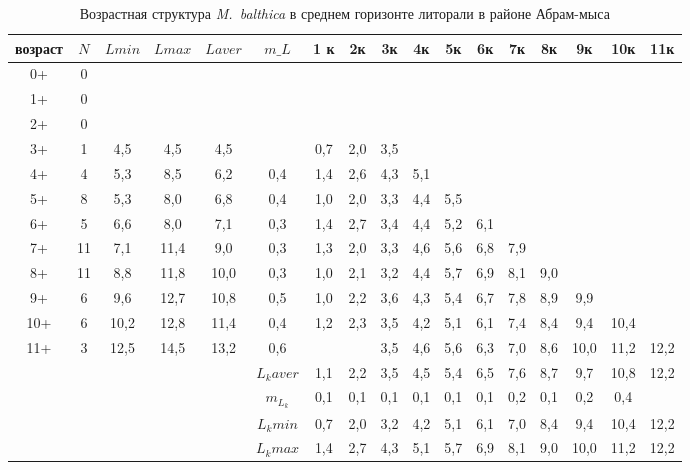 \begin{landscape}

\begin{table}[h]
\caption{Возрастная структура {\it M.~balthica} в среднем горизонте литорали в районе Абрам-мыса }
\label{tab:Abram_sgl_growth_matrix}
\begin{tabular}{|c|c|cc|cc|ccccccccccc|}
\hline
возраст & $N$  & $L min$ & $L max$ & $L aver$ & $m\_L$    & 1 к & 2к  & 3к  & 4к  & 5к  & 6к  & 7к  & 8к  & 9к   & 10к  & 11к  \\ \hline
0+      & 0  &       &       &         &         &     &     &     &     &     &     &     &     &      &      &      \\
1+      & 0  &       &       &         &         &     &     &     &     &     &     &     &     &      &      &      \\
2+      & 0  &       &       &         &         &     &     &     &     &     &     &     &     &      &      &      \\
3+      & 1  & 4,5   & 4,5   & 4,5     &         & 0,7 & 2,0 & 3,5 &     &     &     &     &     &      &      &      \\
4+      & 4  & 5,3   & 8,5   & 6,2     & 0,4     & 1,4 & 2,6 & 4,3 & 5,1 &     &     &     &     &      &      &      \\
5+      & 8  & 5,3   & 8,0   & 6,8     & 0,4     & 1,0 & 2,0 & 3,3 & 4,4 & 5,5 &     &     &     &      &      &      \\
6+      & 5  & 6,6   & 8,0   & 7,1     & 0,3     & 1,4 & 2,7 & 3,4 & 4,4 & 5,2 & 6,1 &     &     &      &      &      \\
7+      & 11 & 7,1   & 11,4  & 9,0     & 0,3     & 1,3 & 2,0 & 3,3 & 4,6 & 5,6 & 6,8 & 7,9 &     &      &      &      \\
8+      & 11 & 8,8   & 11,8  & 10,0    & 0,3     & 1,0 & 2,1 & 3,2 & 4,4 & 5,7 & 6,9 & 8,1 & 9,0 &      &      &      \\
9+      & 6  & 9,6   & 12,7  & 10,8    & 0,5     & 1,0 & 2,2 & 3,6 & 4,3 & 5,4 & 6,7 & 7,8 & 8,9 & 9,9  &      &      \\
10+     & 6  & 10,2  & 12,8  & 11,4    & 0,4     & 1,2 & 2,3 & 3,5 & 4,2 & 5,1 & 6,1 & 7,4 & 8,4 & 9,4  & 10,4 &      \\
11+     & 3  & 12,5  & 14,5  & 13,2    & 0,6     &     &     & 3,5 & 4,6 & 5,6 & 6,3 & 7,0 & 8,6 & 10,0 & 11,2 & 12,2 \\ \hline
        &    &       &       &         & $L_k aver$ & 1,1 & 2,2 & 3,5 & 4,5 & 5,4 & 6,5 & 7,6 & 8,7 & 9,7  & 10,8 & 12,2 \\
        &    &       &       &         & $m_{L_k}$  & 0,1 & 0,1 & 0,1 & 0,1 & 0,1 & 0,1 & 0,2 & 0,1 & 0,2  & 0,4  &      \\
        &    &       &       &         & $L_k min$  & 0,7 & 2,0 & 3,2 & 4,2 & 5,1 & 6,1 & 7,0 & 8,4 & 9,4  & 10,4 & 12,2 \\
        &    &       &       &         & $L_k max$  & 1,4 & 2,7 & 4,3 & 5,1 & 5,7 & 6,9 & 8,1 & 9,0 & 10,0 & 11,2 & 12,2 \\ \hline
\end{tabular}
\end{table}




\end{landscape}
